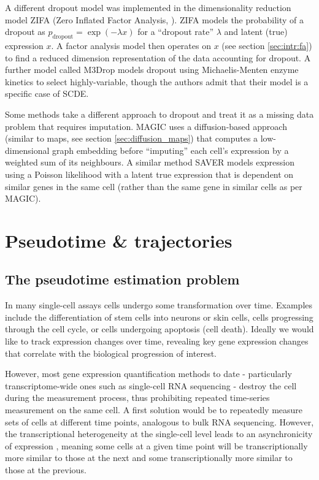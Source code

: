 A different dropout model was implemented in the dimensionality reduction model ZIFA (Zero Inflated Factor Analysis, \cite{pierson2015zifa}). ZIFA models the probability of a dropout as $p_{\text{dropout}} = \exp(-\lambda x)$ for a ``dropout rate'' $\lambda$ and latent (true) expression $x$. A factor analysis model then operates on $x$ (see section \ref{sec:intr:fa}) to find a reduced dimension representation of the data accounting for dropout. A further model called M3Drop \cite{Andrews2016-ij} models dropout using Michaelis-Menten enzyme kinetics to select highly-variable, though the authors admit that their model is a specific case of SCDE.

Some methods take a different approach to dropout and treat it as a missing data problem that requires imputation. MAGIC \cite{Van_Dijk2017-wn} uses a diffusion-based approach (similar to maps, see section \ref{sec:diffusion_maps}) that computes a low-dimensional graph embedding before ``imputing'' each cell's expression by a weighted sum of its neighbours. A similar method SAVER \cite{SAVER} models expression using a Poisson likelihood with a latent true expression that is dependent on similar genes in the same cell (rather than the same gene in similar cells as per MAGIC).

\section{Pseudotime \& trajectories}


\subsection{The pseudotime estimation problem}

In many single-cell assays cells undergo some transformation over time. Examples include the differentiation of stem cells into neurons or skin cells, cells progressing through the cell cycle, or cells undergoing apoptosis (cell death). Ideally we would like to track expression changes over time, revealing key gene expression changes that correlate with the biological progression of interest.

However, most gene expression quantification methods to date - particularly transcriptome-wide ones such as single-cell RNA sequencing - destroy the cell during the measurement process, thus prohibiting repeated time-series measurement on the same cell. A first solution would be to repeatedly measure sets of cells at different time points, analogous to bulk RNA sequencing. However, the transcriptional heterogeneity at the single-cell level leads to an asynchronicity of expression \cite{Trapnell2014-xi}, meaning some cells at a given time point will be transcriptionally more similar to those at the next and some transcriptionally more similar to those at the previous.

